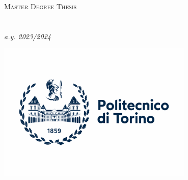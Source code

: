 
\begin{titlepage}
\begin{center}

{\scshape\LARGE \univname\par}\vspace{1.5cm} %
\textsc{\Large Master Degree Thesis}\\[0.5cm] %
\Large\deptname\\[0.5cm] %
\Large\facname\\[0.5cm] %
\textit{\normalsize a.y. 2023/2024} %

\includegraphics[width = 0.7\textwidth]{Figures/Title/logo.png} %

{\huge \bfseries \ttitle\par}\vspace{0.4cm} %
 


\vfill


\end{center}
\end{titlepage}

